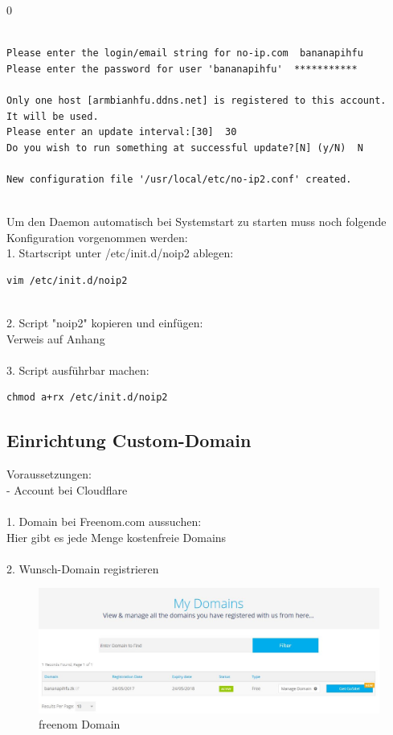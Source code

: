 0
\begin{lstlisting}

Please enter the login/email string for no-ip.com  bananapihfu
Please enter the password for user 'bananapihfu'  ***********

Only one host [armbianhfu.ddns.net] is registered to this account.
It will be used.
Please enter an update interval:[30]  30
Do you wish to run something at successful update?[N] (y/N)  N

New configuration file '/usr/local/etc/no-ip2.conf' created.
\end{lstlisting}
~\\
Um den Daemon automatisch bei Systemstart zu starten muss noch folgende Konfiguration vorgenommen werden:\\
1. Startscript unter /etc/init.d/noip2 ablegen:
\begin{lstlisting}
vim /etc/init.d/noip2
\end{lstlisting}
~\\
2. Script "noip2" kopieren und einfügen:\\
Verweis auf Anhang\\
~\\
3. Script ausführbar machen:
\begin{lstlisting}
chmod a+rx /etc/init.d/noip2
\end{lstlisting}
\newpage
\subsection{Einrichtung Custom-Domain}
Voraussetzungen:\\
- Account bei Cloudflare\\
~\\
1. Domain bei Freenom.com aussuchen:\\
Hier gibt es jede Menge kostenfreie Domains\\
~\\
2. Wunsch-Domain registrieren\\
\begin{figure}[ht]
\includegraphics[width=\textwidth]{pictures/Jonas/freenom_Domain}
\caption{freenom Domain}
\end{figure}

